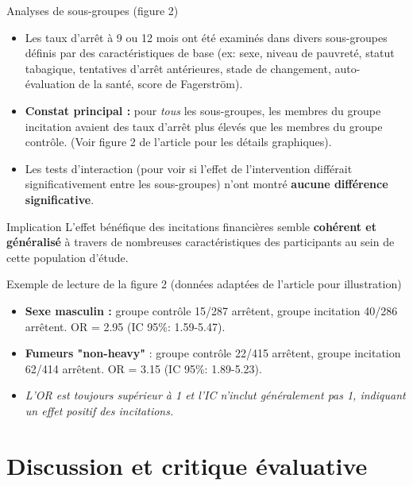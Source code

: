 \documentclass[aspectratio=169,xcolor=dvipsnames]{beamer}
\begin{document}
\begin{frame}{Analyses de sous-groupes (figure 2)}
    \begin{itemize}
        \item Les taux d'arrêt à 9 ou 12 mois ont été examinés dans divers sous-groupes définis par des caractéristiques de base (ex: sexe, niveau de pauvreté, statut tabagique, tentatives d'arrêt antérieures, stade de changement, auto-évaluation de la santé, score de Fagerström).
        \item \textbf{Constat principal :} pour \textit{tous} les sous-groupes, les membres du groupe incitation avaient des taux d'arrêt plus élevés que les membres du groupe contrôle. (Voir figure 2 de l'article pour les détails graphiques).
        \item Les tests d'interaction (pour voir si l'effet de l'intervention différait significativement entre les sous-groupes) n'ont montré \textbf{aucune différence significative}.
    \end{itemize}
    \begin{block}{Implication}
        L'effet bénéfique des incitations financières semble \textbf{cohérent et généralisé} à travers de nombreuses caractéristiques des participants au sein de cette population d'étude.
    \end{block}
    \begin{alertblock}{Exemple de lecture de la figure 2 (données adaptées de l'article pour illustration)}
        \begin{itemize}
            \item \textbf{Sexe masculin :} groupe contrôle 15/287 arrêtent, groupe incitation 40/286 arrêtent. OR = 2.95 (IC 95\%: 1.59-5.47).
            \item \textbf{Fumeurs "non-heavy"} : groupe contrôle 22/415 arrêtent, groupe incitation 62/414 arrêtent. OR = 3.15 (IC 95\%: 1.89-5.23).
            \item \textit{L'OR est toujours supérieur à 1 et l'IC n'inclut généralement pas 1, indiquant un effet positif des incitations.}
        \end{itemize}
    \end{alertblock}
\end{frame}

\section{Discussion et critique évaluative}
\end{document}
